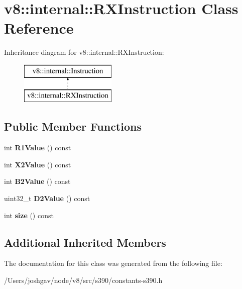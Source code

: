 \hypertarget{classv8_1_1internal_1_1_r_x_instruction}{}\section{v8\+:\+:internal\+:\+:R\+X\+Instruction Class Reference}
\label{classv8_1_1internal_1_1_r_x_instruction}
Inheritance diagram for v8\+:\+:internal\+:\+:R\+X\+Instruction\+:\begin{figure}[H]
\begin{center}
\leavevmode
\includegraphics[height=2.000000cm]{classv8_1_1internal_1_1_r_x_instruction}
\end{center}
\end{figure}
\subsection*{Public Member Functions}
\begin{DoxyCompactItemize}
\item 
int {\bfseries R1\+Value} () const \hypertarget{classv8_1_1internal_1_1_r_x_instruction_af9385925e4442899490cbab3ed363fea}{}\label{classv8_1_1internal_1_1_r_x_instruction_af9385925e4442899490cbab3ed363fea}

\item 
int {\bfseries X2\+Value} () const \hypertarget{classv8_1_1internal_1_1_r_x_instruction_a57e17afe1f1516ffc213f4cbdab8ad11}{}\label{classv8_1_1internal_1_1_r_x_instruction_a57e17afe1f1516ffc213f4cbdab8ad11}

\item 
int {\bfseries B2\+Value} () const \hypertarget{classv8_1_1internal_1_1_r_x_instruction_aa7c36b7a9e761031a0fd53c72748df80}{}\label{classv8_1_1internal_1_1_r_x_instruction_aa7c36b7a9e761031a0fd53c72748df80}

\item 
uint32\+\_\+t {\bfseries D2\+Value} () const \hypertarget{classv8_1_1internal_1_1_r_x_instruction_a7e914eee9e6e640c6b58d119a128e650}{}\label{classv8_1_1internal_1_1_r_x_instruction_a7e914eee9e6e640c6b58d119a128e650}

\item 
int {\bfseries size} () const \hypertarget{classv8_1_1internal_1_1_r_x_instruction_ae3893774d46ee782c109b6cd91811c6e}{}\label{classv8_1_1internal_1_1_r_x_instruction_ae3893774d46ee782c109b6cd91811c6e}

\end{DoxyCompactItemize}
\subsection*{Additional Inherited Members}


The documentation for this class was generated from the following file\+:\begin{DoxyCompactItemize}
\item 
/\+Users/joshgav/node/v8/src/s390/constants-\/s390.\+h\end{DoxyCompactItemize}
